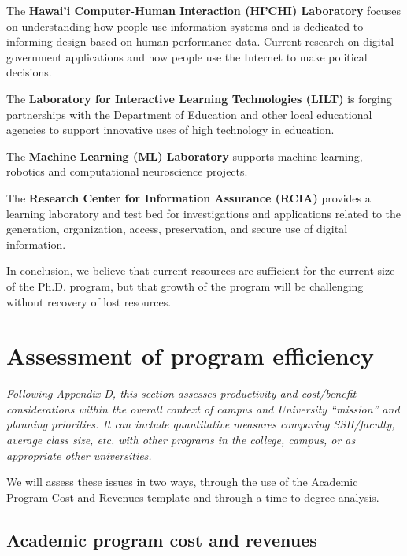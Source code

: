 \documentclass[12pt]{article}
\begin{document}
\medskip\noindent The {\bf Hawai'i Computer-Human Interaction (HI'CHI) Laboratory} focuses on
understanding how people use information systems and is dedicated to
informing design based on human performance data. Current research on
digital government applications and how people use the Internet to make
political decisions.

\medskip\noindent The {\bf Laboratory for Interactive Learning Technologies (LILT)} is
forging partnerships with the Department of Education and other local
educational agencies to support innovative uses of high technology in
education.

\medskip\noindent The {\bf Machine Learning (ML) Laboratory} supports machine learning,
robotics and computational neuroscience projects.

\medskip\noindent The {\bf Research Center for Information Assurance (RCIA)} provides a
learning laboratory and test bed for investigations and applications
related to the generation, organization, access, preservation, and secure
use of digital information.


In conclusion, we believe that current resources are sufficient for the
current size of the Ph.D. program, but that growth of the program will be
challenging without recovery of lost resources.




\section{Assessment of program efficiency}

{\em Following Appendix D, this section assesses productivity and
  cost/benefit considerations within the overall context of campus and
  University ``mission'' and planning priorities.  It can include
  quantitative measures comparing SSH/faculty, average class size,
  etc. with other programs in the college, campus, or as appropriate other
  universities.}

We will assess these issues in two ways, through the use of the Academic
Program Cost and Revenues template and through a time-to-degree analysis.

\subsection{Academic program cost and revenues}
\label{sec:costs}
\end{document}
